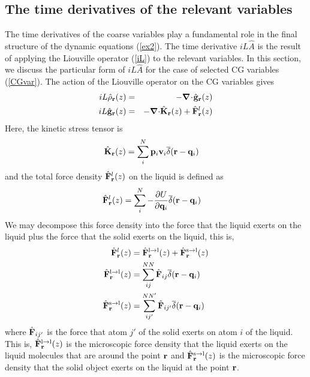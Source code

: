 \documentclass[b5paper,openright,11pt]{book}
\newcommand{\esc}{\!\cdot\!}
\begin{document}
\subsection{The time derivatives of the relevant variables}
The time derivatives  of the coarse variables play  a fundamental role
in the final structure of  the dynamic equations (\ref{ex2}). The time
derivative $  iL\hat{A}$ is  the result of  applying the  Liouville operator
(\ref{iL}) to the relevant variables.  In this section, we discuss the
particular  form of  $  iL\hat{A}$ for  the case  of  selected CG  variables
(\ref{CGvar}). The action of the Liouville operator on the CG variables gives \cite{Espanol2015a}
\begin{eqnarray}
  iL \hat{\rho}_{\bf r}(z) &=& -\boldsymbol{\nabla}\esc\hat{\bf g}_{\bf r}(z)
\nonumber\\
iL  \hat{\bf g}_{\bf r}(z) &=& -\boldsymbol{\nabla}{\cdot} \hat{{\bf K}}_{\bf r}(z)+
\hat{\bf F}^l_{\bf r}(z)
\label{ildens}
\end{eqnarray}
Here, the kinetic stress tensor is 
\begin{align}
  \hat{{\bf K}}_{\bf r}(z) &=\sum^{N}_i{\bf p}_i{\bf v}_i
\overline{\delta}({\bf r}-{\bf q}_i)
\end{align}
and the total  force density $\hat{\bf F}^l_{\bf r}(z)$  on the liquid
is defined as
\begin{align}
  \hat{\bf F}^l_{\bf r}(z) &
=\sum_i^N-\frac{\partial U}{\partial {\bf q}_i}\overline{\delta}({\bf r}-{\bf q}_i)
\label{Frtot}
\end{align}
We may decompose  this force density into the
force that  the liquid exerts on  the liquid plus the  force that the
solid   exerts  on  the   liquid,  this   is,  
\begin{align}
   \hat{\bf  F}^l_{\bf
  r}(z)&=\hat{\bf  F}^{\rm l\to  l}_{\bf r}(z)  +\hat{\bf  F}^{\rm s\to
  l}_{\bf r}(z) 
\nonumber\\
\hat{\bf F}^{\rm l\to l}_{\bf r}(z) &= \sum^{NN}_{ij}\hat{\bf F}_{ij}\overline{\delta}({\bf r}-{\bf q}_i)
\nonumber\\
\hat{\bf F}^{\rm s\to l}_{\bf r}(z) &= \sum^{NN'}_{ij'}\hat{\bf F}_{ij'}\overline{\delta}({\bf r}-{\bf q}_i)
\label{Fr}
\end{align}
where $\hat{\bf F}_{ij'}$ is the force  that atom $j'$ of the solid
exerts on  atom $i$ of  the liquid.   This is, $\hat{\bf  F}^{\rm l\to
  l}_{\bf r}(z)  $ is  the microscopic force  density that  the liquid
exerts on the liquid molecules that are around the point ${\bf r}$ and
$\hat{\bf F}^{\rm s\to l}_{\bf r}(z)$ is the microscopic force density
that the solid object exerts on the liquid at the point ${\bf r}$.
\end{document}
